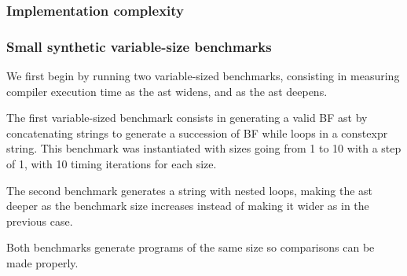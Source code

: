 \documentclass[../main]{subfiles}
\begin{document}
\subsubsection{
  Implementation complexity
}

\subsubsection{
  Small synthetic variable-size benchmarks
}

We first begin by running two variable-sized benchmarks, consisting in
measuring compiler execution time as the \gls{ast} widens, and as the \gls{ast} deepens.

The first variable-sized benchmark consists in generating a valid BF \gls{ast} by
concatenating strings to generate a succession of BF while loops in a
\gls{constexpr} string. This benchmark was instantiated with sizes going from 1 to
10 with a step of 1, with 10 timing iterations for each size.

The second benchmark generates a string with
nested loops, making the \gls{ast} deeper as the benchmark size increases instead
of making it wider as in the previous case.

Both benchmarks generate programs of the same size so comparisons can be made
properly.
\end{document}
